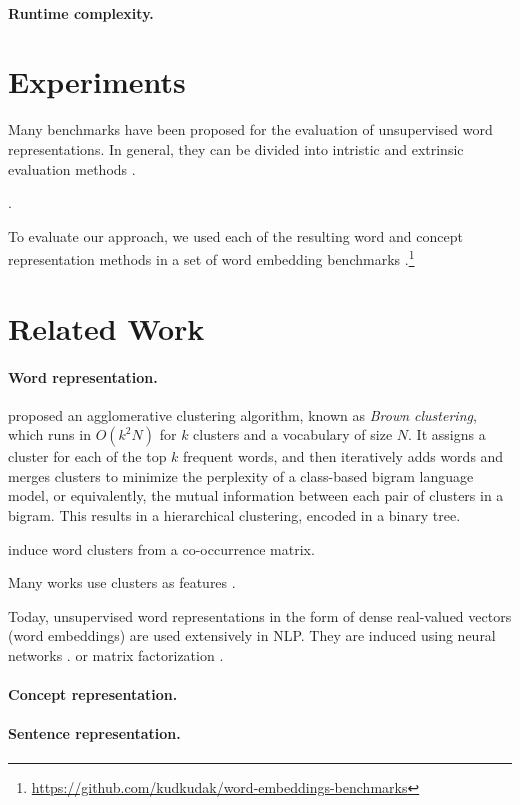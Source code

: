 \documentclass{article}
\begin{document}
\paragraph{Runtime complexity.}



\section{Experiments}\label{sec:experiments}

Many benchmarks have been proposed for the evaluation of unsupervised word
representations.
In general, they can be divided into intristic and extrinsic evaluation methods \cite{schnabel2015evaluation,jastrzebski2017evaluate}.

\cite{hill2015simlex,avraham2016improving}.

To evaluate our approach, we used each of the resulting word and concept
representation methods in a set of word embedding benchmarks
\cite{jastrzebski2017evaluate}.\footnote{\url{https://github.com/kudkudak/word-embeddings-benchmarks}}


\section{Related Work}\label{sec:related_work}

\paragraph{Word representation.}
\citet{brown1992class} proposed an agglomerative clustering algorithm,
known as \textit{Brown clustering},
which runs in $O(k^2N)$ for $k$ clusters and a vocabulary of size $N$.
It assigns a cluster for each of the top $k$ frequent words,
and then iteratively adds words and merges clusters to minimize the
perplexity of a class-based bigram language model,
or equivalently, the mutual information between each pair of clusters in a bigram.
This results in a hierarchical clustering, encoded in a binary tree.

\citet{pereira1993distributional} induce word clusters from a co-occurrence matrix.

Many works use clusters as features \cite{miller2004name,koo2008simple,huang2009distributional,zhao2009multilingual}.

Today, unsupervised word representations in the form of dense real-valued vectors
(word embeddings) are used extensively in NLP.
They are induced using neural networks 
\cite{bengio2003neural,mnih2007three,collobert2008unified,turian2010word,mikolov2013efficient}.
or matrix factorization \cite{pennington2014glove}.

\paragraph{Concept representation.}


\paragraph{Sentence representation.}




\end{document}
